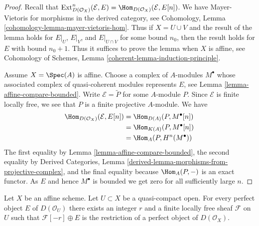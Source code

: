 \begin{proof}
Recall that $\text{Ext}^n_{D(\mathcal{O}_X)}(\mathcal{E}, E) =
\Hom_{D(\mathcal{O}_X)}(\mathcal{E}, E[n])$. We have
Mayer-Vietoris for morphisms in the derived category, see
Cohomology, Lemma \ref{cohomology-lemma-mayer-vietoris-hom}.
Thus if $X = U \cup V$ and the result of the lemma holds
for $E|_U$, $E|_V$, and $E|_{U \cap V}$ for some bound $n_0$,
then the result holds for $E$ with bound $n_0 + 1$.
Thus it suffices to prove the lemma when $X$ is affine, see
Cohomology of Schemes, Lemma \ref{coherent-lemma-induction-principle}.

\medskip\noindent
Assume $X = \Spec(A)$ is affine. Choose a complex of $A$-modules
$M^\bullet$ whose associated complex of quasi-coherent modules
represents $E$, see Lemma \ref{lemma-affine-compare-bounded}.
Write $\mathcal{E} = \widetilde{P}$ for some $A$-module $P$.
Since $\mathcal{E}$ is finite locally free, we see that $P$
is a finite projective $A$-module. We have
\begin{align*}
\Hom_{D(\mathcal{O}_X)}(\mathcal{E}, E[n])
& = 
\Hom_{D(A)}(P, M^\bullet[n]) \\
& =
\Hom_{K(A)}(P, M^\bullet[n]) \\
& =
\Hom_A(P, H^n(M^\bullet))
\end{align*}
The first equality by Lemma \ref{lemma-affine-compare-bounded},
the second equality by
Derived Categories, Lemma
\ref{derived-lemma-morphisms-from-projective-complex}, and
the final equality because $\Hom_A(P, -)$ is an exact functor.
As $E$ and hence $M^\bullet$ is bounded
we get zero for all sufficiently large $n$.
\end{proof}

\begin{lemma}
\label{lemma-lift-perfect-complex-plus-locally-free}
Let $X$ be an affine scheme. Let $U \subset X$ be a quasi-compact open.
For every perfect object $E$ of $D(\mathcal{O}_U)$ there exists an integer
$r$ and a finite locally free sheaf $\mathcal{F}$ on $U$ such that
$\mathcal{F}[-r] \oplus E$ is the restriction of a perfect object of
$D(\mathcal{O}_X)$.
\end{lemma}

